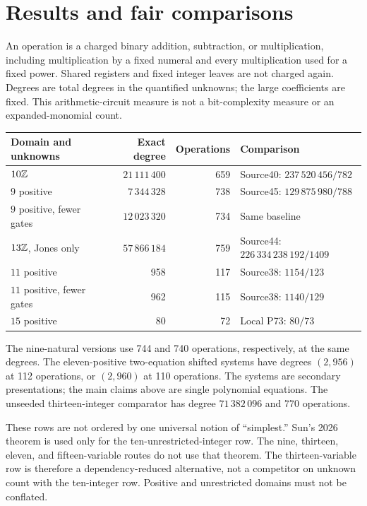 \section{Results and fair comparisons}
An operation is a charged binary addition, subtraction, or multiplication,
including multiplication by a fixed numeral and every multiplication used
for a fixed power. Shared registers and fixed integer leaves are not
charged again. Degrees are total degrees in the quantified unknowns; the
large coefficients are fixed. This arithmetic-circuit measure is not a
bit-complexity measure or an expanded-monomial count.

\begin{center}\small
\begin{tabular}{@{}lrrl@{}}
\toprule
Domain and unknowns & Exact degree & Operations & Comparison\\
\midrule
$10\mathbb Z$ & $21\,111\,400$ & 659 & Source40: $237\,520\,456/782$\\
$9$ positive & $7\,344\,328$ & 738 & Source45: $129\,875\,980/788$\\
$9$ positive, fewer gates & $12\,023\,320$ & 734 & Same baseline\\
$13\mathbb Z$, Jones only & $57\,866\,184$ & 759 & Source44: $226\,334\,238\,192/1409$\\
$11$ positive & 958 & 117 & Source38: $1154/123$\\
$11$ positive, fewer gates & 962 & 115 & Source38: $1140/129$\\
$15$ positive & 80 & 72 & Local P73: $80/73$\\
\bottomrule
\end{tabular}
\end{center}
The nine-natural versions use 744 and 740 operations, respectively, at
the same degrees. The eleven-positive two-equation shifted systems have
degrees $(2,956)$ at 112 operations, or $(2,960)$ at 110 operations. The
systems are secondary presentations; the main claims above are single
polynomial equations. The unseeded thirteen-integer comparator has degree
$71\,382\,096$ and 770 operations.

These rows are not ordered by one universal notion of ``simplest.'' Sun's
2026 theorem is used only for the ten-unrestricted-integer row. The nine,
thirteen, eleven, and fifteen-variable routes do not use that theorem.
The thirteen-variable row is therefore a dependency-reduced alternative,
not a competitor on unknown count with the ten-integer row. Positive and
unrestricted domains must not be conflated.


